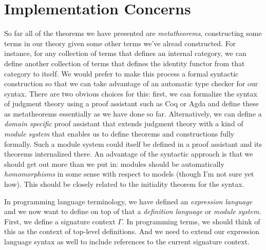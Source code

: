 \documentclass{article}
\begin{document}
\section{Implementation Concerns}

So far all of the theorems we have presented are \emph{metatheorems},
constructing some terms in our theory given some other terms we've
alread constructed. For instance, for any collection of terms that
defines an internal category, we can define another collection of
terms that defines the identity functor from that category to
itself. We would prefer to make this process a formal syntactic
construction so that we can take advantage of an automatic type
checker for our syntax. There are two obvious choices for this: first,
we can formalize the syntax of judgment theory using a proof assistant
such as Coq or Agda and define these as metatheorems essentially as we
have done so far. Alternatively, we can define a \emph{domain
  specific} proof assistant that extends judgment theory with a kind
of \emph{module system} that enables us to define theorems and
constructions fully formally. Such a module system could itself be
defined in a proof assistant and its theorems internalized there. An
advantage of the syntactic approach is that we should get out more
than we put in: modules should be automatically \emph{homomorphisms}
in some sense with respect to models (though I'm not sure yet how).
This should be closely related to the initiality theorem for the
syntax.

In programming language terminology, we have defined an
\emph{expression language} and we now want to define on top of that a
\emph{definition language} or \emph{module system}.
%
First, we define a signature context $\Gamma$. In programming terms,
we should think of this as the context of top-level definitions.
%
And we need to extend our expression language syntax as well to
include references to the current signature context.
\end{document}
